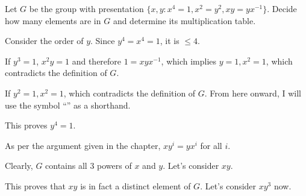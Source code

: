 \begin{exercise}
    Let \(G\) be the group with presentation
    \(\{x,y : x^4 = 1, x^2 = y^2, xy = yx^{ - 1}\}\).
    Decide how many elements are in \(G\) and determine its multiplication table.
\end{exercise}
\begin{solution}
    Consider the order of \(y\). Since \(y^4 = x^4 = 1\), it is \(\leq 4\).

    If \(y^3 = 1\), \(x^2y = 1\) and therefore \(1 = xyx^{ - 1}\), which implies \(y = 1, x^2 = 1\), which contradicts the definition of \(G\).

    If \(y^2 = 1, x^2 = 1\), which contradicts the definition of \(G\). From here onward, I will use the symbol ``\textreferencemark'' as a shorthand.

    This proves \(y^4 = 1\).

    As per the argument given in the chapter, \(xy^i = yx^i\) for all \(i\).

    Clearly, \(G\) contains all 3 powers of \(x\) and \(y\). Let's consider \(xy\).

    \begin{caseof}
    \end{caseof}

    This proves that \(xy\) is in fact a distinct element of \(G\). Let's consider \(xy^3\) now.

    \begin{caseof}
    \end{caseof}


\end{solution}
